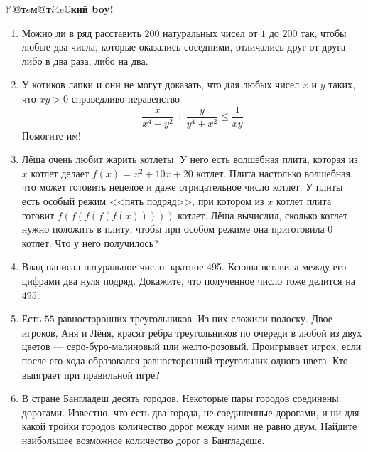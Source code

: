 \documentclass{article}
\begin{document}
    \large


    \begin{center}
        \textbf{$\mathbb{M}$@т$e$м@т$i4e\mathbb{C}$кий boy!}
    \end{center}

    \begin{enumerate}[label*=\arabic{enumi}.]

        \item Можно ли в ряд расставить $200$ натуральных чисел от $1$ до $200$ так, чтобы любые два числа, которые оказались соседними, отличались друг от друга либо в два раза, либо на два.
        \item  У котиков лапки и они не могут доказать, что для любых чисел $x$ и $y$ таких, что $xy > 0$ справедливо неравенство
        \[\frac{x}{x^4 + y^2} + \frac{y}{y^4 + x^2} \leqslant \frac{1}{xy}\]
        Помогите им!

        \item Лёша очень любит жарить котлеты.
        У него есть волшебная плита, которая из $x$ котлет делает $f(x) =  x^2 + 10x + 20$ котлет.
        Плита настолько волшебная, что может готовить нецелое и даже отрицательное число котлет.
        У плиты есть особый режим <<пять подряд>>, при котором из $x$ котлет плита готовит $f(f(f(f(f(x)))))$ котлет.
        Лёша вычислил, сколько котлет нужно положить в плиту, чтобы при особом режиме она приготовила 0 котлет.
        Что у него получилось?

        \item Влад написал натуральное число, кратное 495.
        Ксюша вставила между его цифрами два нуля подряд.
        Докажите, что полученное число тоже делится на 495.


        \item  Есть $55$ равносторонних треугольников.
        Из них сложили полоску.
        Двое игроков, Аня и Лёня, красят ребра треугольников по очереди в любой из двух цветов --- серо-буро-малиновый или желто-розовый.
        Проигрывает игрок, если после его хода образовался равносторонний треугольник одного цвета.
        Кто выиграет при правильной игре?

        \item В стране Бангладеш десять городов.
        Некоторые пары городов соединены дорогами.
        Известно, что есть два города, не соединенные дорогами, и ни для какой тройки городов количество дорог между ними не равно двум.
        Найдите наибольшее возможное количество дорог в Бангладеше.


\end{enumerate}
\end{document}
